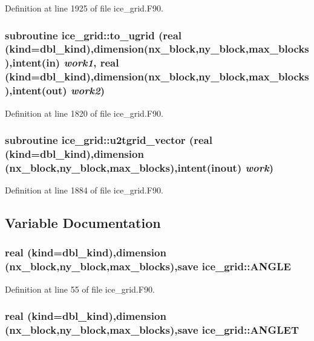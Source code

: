 Definition at line 1925 of file ice\_\-grid.F90.\hypertarget{namespaceice__grid_af263876d35043749020fcd9c12766b3f}{
\subsubsection[{to\_\-ugrid}]{\setlength{\rightskip}{0pt plus 5cm}subroutine ice\_\-grid::to\_\-ugrid (real (kind=dbl\_\-kind),dimension(nx\_\-block,ny\_\-block,max\_\-blocks),intent(in) {\em work1}, \/  real (kind=dbl\_\-kind),dimension(nx\_\-block,ny\_\-block,max\_\-blocks),intent(out) {\em work2})}}
\label{namespaceice__grid_af263876d35043749020fcd9c12766b3f}


Definition at line 1820 of file ice\_\-grid.F90.\hypertarget{namespaceice__grid_aefb15c768a63706ec6a5155d55b6c5a9}{
\subsubsection[{u2tgrid\_\-vector}]{\setlength{\rightskip}{0pt plus 5cm}subroutine ice\_\-grid::u2tgrid\_\-vector (real (kind=dbl\_\-kind),dimension (nx\_\-block,ny\_\-block,max\_\-blocks),intent(inout) {\em work})}}
\label{namespaceice__grid_aefb15c768a63706ec6a5155d55b6c5a9}


Definition at line 1884 of file ice\_\-grid.F90.

\subsection{Variable Documentation}
\hypertarget{namespaceice__grid_a0a538e97fcd87790e7fae5de82bd0e77}{
\subsubsection[{ANGLE}]{\setlength{\rightskip}{0pt plus 5cm}real (kind=dbl\_\-kind),dimension (nx\_\-block,ny\_\-block,max\_\-blocks),save {\bf ice\_\-grid::ANGLE}}}
\label{namespaceice__grid_a0a538e97fcd87790e7fae5de82bd0e77}


Definition at line 55 of file ice\_\-grid.F90.\hypertarget{namespaceice__grid_aa8fc09d102ada560318d68276c1dfd57}{
\subsubsection[{ANGLET}]{\setlength{\rightskip}{0pt plus 5cm}real (kind=dbl\_\-kind),dimension (nx\_\-block,ny\_\-block,max\_\-blocks),save {\bf ice\_\-grid::ANGLET}}}
\label{namespaceice__grid_aa8fc09d102ada560318d68276c1dfd57}



